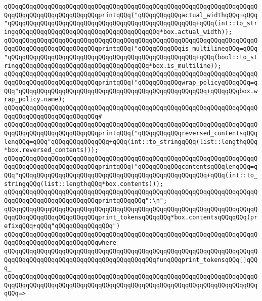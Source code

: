 \verb|qQQqqQQqqQQqqQQqqQQqqQQqqQQqqQQqqQQqqQQqqQQqqQQqqQQqqQQqqQQqqQQqqQQqqQQqqQQqqQQqqQQqqQQqqQQqqQQqprintqQQq("qQQqqQQqqQQqactual_widthqQQq=qQQq"qQQqqQQqqQQqqQQqqQQqqQQqqQQqqQQqqQQqqQQqqQQqqQQqqQQq+qQQq(int::to_stringqQQqqQQqqQQqqQQqqQQqqQQqqQQqqQQqqQQqqQQq*box.actual_width));|\newline
\verb|qQQqqQQqqQQqqQQqqQQqqQQqqQQqqQQqqQQqqQQqqQQqqQQqqQQqqQQqqQQqqQQqqQQqqQQqqQQqqQQqqQQqqQQqqQQqqQQqprintqQQq("qQQqqQQqqQQqis_multilineqQQq=qQQq"qQQqqQQqqQQqqQQqqQQqqQQqqQQqqQQqqQQqqQQqqQQqqQQqqQQq+qQQq(bool::to_stringqQQqqQQqqQQqqQQqqQQqqQQqqQQqqQQqqQQq*box.is_multiline));|\newline
\verb|qQQqqQQqqQQqqQQqqQQqqQQqqQQqqQQqqQQqqQQqqQQqqQQqqQQqqQQqqQQqqQQqqQQqqQQqqQQqqQQqqQQqqQQqqQQqqQQqprintqQQq("qQQqqQQqqQQqwrap_policyqQQqqQQq=qQQq"qQQqqQQqqQQqqQQqqQQqqQQqqQQqqQQqqQQqqQQqqQQqqQQqqQQq+qQQqqQQqbox.wrap_policy.name);|\newline
\verb|qQQqqQQqqQQqqQQqqQQqqQQqqQQqqQQqqQQqqQQqqQQqqQQqqQQqqQQqqQQqqQQqqQQqqQQqqQQqqQQqqQQqqQQqqQQqqQQq#|\newline
\verb|qQQqqQQqqQQqqQQqqQQqqQQqqQQqqQQqqQQqqQQqqQQqqQQqqQQqqQQqqQQqqQQqqQQqqQQqqQQqqQQqqQQqqQQqqQQqqQQqprintqQQq("qQQqqQQqqQQqreversed_contentsqQQqlenqQQq=qQQq"qQQqqQQqqQQqqQQq+qQQq(int::to_stringqQQq(list::lengthqQQq*box.reversed_contents)));|\newline
\verb|qQQqqQQqqQQqqQQqqQQqqQQqqQQqqQQqqQQqqQQqqQQqqQQqqQQqqQQqqQQqqQQqqQQqqQQqqQQqqQQqqQQqqQQqqQQqqQQqprintqQQq("qQQqqQQqqQQqcontentsqQQqlenqQQq=qQQq"qQQqqQQqqQQqqQQqqQQqqQQqqQQqqQQqqQQqqQQqqQQqqQQqqQQq+qQQq(int::to_stringqQQq(list::lengthqQQq*box.contents)));|\newline
\verb|qQQqqQQqqQQqqQQqqQQqqQQqqQQqqQQqqQQqqQQqqQQqqQQqqQQqqQQqqQQqqQQqqQQqqQQqqQQqqQQqqQQqqQQqqQQqqQQqprintqQQqqQQq":\n";|\newline
\newline
\verb|qQQqqQQqqQQqqQQqqQQqqQQqqQQqqQQqqQQqqQQqqQQqqQQqqQQqqQQqqQQqqQQqqQQqqQQqqQQqqQQqqQQqqQQqqQQqqQQqprint_tokensqQQqqQQq*box.contentsqQQqqQQq(prefixqQQq+qQQq"qQQqqQQqqQQqqQQq")|\newline
\verb|qQQqqQQqqQQqqQQqqQQqqQQqqQQqqQQqqQQqqQQqqQQqqQQqqQQqqQQqqQQqqQQqqQQqqQQqqQQqqQQqqQQqqQQqqQQqqQQqwhere|\newline
\verb|qQQqqQQqqQQqqQQqqQQqqQQqqQQqqQQqqQQqqQQqqQQqqQQqqQQqqQQqqQQqqQQqqQQqqQQqqQQqqQQqqQQqqQQqqQQqqQQqqQQqqQQqqQQqqQQqfunqQQqprint_tokensqQQq[]qQQq_|\newline
\verb|qQQqqQQqqQQqqQQqqQQqqQQqqQQqqQQqqQQqqQQqqQQqqQQqqQQqqQQqqQQqqQQqqQQqqQQqqQQqqQQqqQQqqQQqqQQqqQQqqQQqqQQqqQQqqQQqqQQqqQQqqQQqqQQqqQQqqQQqqQQqqQQq=>|\newline
